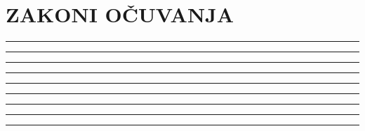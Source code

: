 \documentclass[10pt]{book}
\newcounter{zadatak} %
\newcounter{cjelina}
\begin{document}
\newpage
\chapter{ZAKONI OČUVANJA}
\setcounter{zadatak}{0}




{\color{boja} \rule{\linewidth}{0.3mm} }

\vspace{0.2cm} 




{\color{boja} \rule{\linewidth}{0.3mm} }

\vspace{0.2cm}





{\color{boja} \rule{\linewidth}{0.3mm} }


\vspace{1cm}


{\color{boja} \rule{\linewidth}{0.3mm} }


\vspace{1cm}


{\color{boja} \rule{\linewidth}{0.3mm} }


\vspace{1cm}


{\color{boja} \rule{\linewidth}{0.3mm} }



\vspace{1cm}


{\color{boja} \rule{\linewidth}{0.3mm} }


\vspace{1cm}


{\color{boja} \rule{\linewidth}{0.3mm} }






{\color{boja} \rule{\linewidth}{0.3mm} }

\vspace{0.2cm} 
\end{document}
